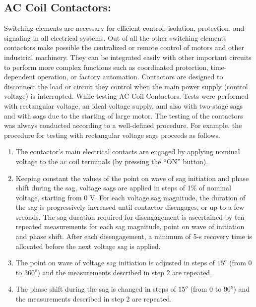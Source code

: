 \documentclass[17pt, a4paper]{extreport}
\begin{document}
\begin{enumerate}
 \subsection{AC Coil Contactors:} Switching elements are necessary for efficient control, isolation, protection, and signaling in all electrical systems. Out of all the other switching elements contactors make possible the centralized or remote control of motors and other industrial machinery. They can be integrated easily with other important circuits to perform more complex functions such as coordinated protection, time-dependent operation, or factory automation. Contactors are designed to disconnect the load or circuit they control when the main power supply (control voltage) is interrupted. While testing AC Coil Contactors. Tests were performed with rectangular voltage, an ideal voltage supply, and also with two-stage sags and with sags due to the starting of large motor. The testing of the contactors was always conducted according to a well-defined procedure. For example, the procedure for testing with rectangular voltage sags proceeds as follows.
 \begin{enumerate}
     \item The contactor’s main electrical contacts are engaged by applying nominal voltage to the ac coil terminals (by pressing
the “ON” button).
\item Keeping constant the values of the point on wave of sag initiation and phase shift during the sag, voltage sags are applied in steps of 1\% of nominal voltage, starting from 0 V. For each voltage sag magnitude, the duration of the sag is progressively increased until contactor disengages, or up to a few seconds. The sag duration required for disengagement is ascertained by ten repeated measurements for each sag magnitude, point on wave of initiation and phase shift. After each disengagement, a minimum of 5-s recovery time is allocated before the next voltage sag is applied. 
\item The point on wave of voltage sag initiation is adjusted in steps of $15^{o}$ (from 0 to $360^{o}$) and the measurements described
in step 2 are repeated.
\item The phase shift during the sag is changed in steps of $15^{o}$ (from 0 to $90^{o}$) and the measurements described in step 2 are
repeated. 
\end{enumerate}
 \begin{figure}
     \centering

\end{figure}
\end{enumerate}
\end{document}
